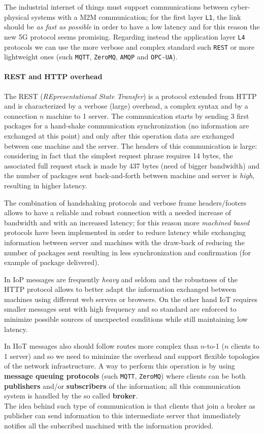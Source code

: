 		The industrial internet of things must support communications between cyber-physical systems with a M2M communication; for the first layer \texttt{L1}, the link should be \textit{as fast as possible} in order to have a low latency and for this reason the new 5G protocol seems promising. Regarding instead the application layer \texttt{L4} protocols we can use the  more verbose and complex standard such \texttt{REST} or more lightweight ones (such \texttt{MQTT}, \texttt{ZeroMQ}, \texttt{AMQP} and \texttt{OPC-UA}).
	
		\paragraph{REST and HTTP overhead} The REST (\textit{REpresentational State Transfer}) is a protocol extended from HTTP and is characterized by a verbose (large) overhead, a complex syntax and by a connection $n$ machine to 1 server. The communication starts by sending 3 first packages for a hand-shake communication synchronization (no information are exchanged at this point) and only after this operation data are exchanged between one machine and the server. The headers of this communication is large: considering in fact that the simplest request phrase requires 14 bytes, the associated full request stack is made by 437 bytes (need of bigger bandwidth) and the number of packages sent back-and-forth between machine and server is \textit{high}, resulting in higher latency.
		
		The combination of handshaking protocols and verbose frame headers/footers allows to have a reliable and robust connection with a needed increase of bandwidth and with an increased latency; for this reason more \textit{machined based} protocols have been implemented in order to reduce latency while exchanging information between server and machines with the draw-back of reducing the number of packages sent resulting in less synchronization and confirmation (for example of package delivered).
	
		In IoP messages are frequently \textit{heavy} and seldom and the robustness of the HTTP protocol allows to better adapt the information exchanged between machines using different web servers or browsers. On the other hand IoT requires smaller messages sent with high frequency and so standard are enforced to minimize possible sources of unexpected conditions while still maintaining low latency.
		
		In IIoT messages also should follow routes more complex than $n$-to-1 ($n$ clients to 1 server) and so we need to minimize the overhead and support flexible topologies of the network infrastructure. A way to perform this operation is by using \textbf{message queuing protocols} (such \texttt{MQTT}, \texttt{ZeroMQ}) where clients can be both \textbf{publishers} and/or \textbf{subscribers} of the information; all this communication system is handled by the so called \textbf{broker}.\\
		The idea behind such type of communication is that clients that join a broker as publisher can send information to this intermediate server that immediately notifies all the subscribed machined with the information provided.
	
	
	
	
	
	
	
	
	
	
	
	
	
	
	
	